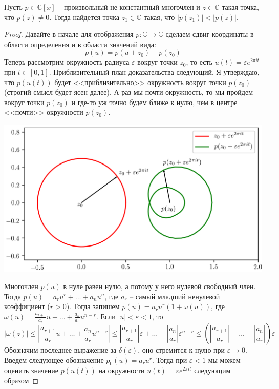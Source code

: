 \begin{claim}
Пусть $p\in\mathbb C[x]$ -- произвольный не константный многочлен и $z\in \mathbb C$ такая точка, что $p(z)\neq 0$. Тогда найдется точка $z_1\in \mathbb C$ такая, что $|p(z_1)|<|p(z)|$.
\end{claim}
\begin{proof}

Давайте в начале для отображения $p\colon \mathbb C\to \mathbb C$ сделаем сдвиг координаты в области определения и в области значений вида:
\[
p(u) = p(u + z_0) - p(z_0)
\]
Теперь рассмотрим окружность радиуса $\varepsilon$ вокруг точки $z_0$, то есть $u(t) = \varepsilon e^{2\pi i t}$ при $t\in [0,1]$. Приблизительный план доказательства следующий. Я утверждаю, что $p(u(t))$ будет <<приблизительно>> окружность вокруг точки $p(z_0)$ (строгий смысл будет ясен далее). А раз мы почти окружность, то мы пройдем вокруг точки $p(z_0)$ и где-то уж точно будем ближе к нулю, чем в центре <<почти>> окружности $p(z_0)$.
\begin{center}
\includegraphics[scale = 0.5]{Figures/graph_cyrcle_cut.png}
\end{center}
Многочлен $p(u)$ в нуле равен нулю, а потому у него нулевой свободный член. Тогда $p(u) = a_r u^r + \ldots + a_n u^n$, где $a_r$ -- самый младший ненулевой коэффициент ($r > 0$). Тогда запишем $p(u) = a_r u^r (1 + \omega(u))$, где $\omega(u) = \frac{a_{r+1}}{a_r}u + \ldots + \frac{a_n}{a_r} u^{n-r}$. Если $|u| < \varepsilon < 1$, то 
\[
|\omega(z)| \leqslant \left| \frac{a_{r+1}}{a_r}u+ \ldots + \frac{a_n}{a_r} u^{n-r}\right| \leqslant  \left|\frac{a_{r+1}}{a_r}\right| \varepsilon+ \ldots + \left|\frac{a_n}{a_r}\right| \varepsilon^{n-r} \leqslant  \left(\left|\frac{a_{r+1}}{a_r}\right|+ \ldots + \left|\frac{a_n}{a_r}\right| \right)\varepsilon
\]
Обозначим последнее выражение за $\delta(\varepsilon)$, оно стремится к нулю при $\varepsilon \to 0$. Введем следующее обозначение $p_0(u) = a_r u^r$. Тогда при $\varepsilon < 1$ мы можем оценить значение $p(u(t))$ на окружности $u(t) = \varepsilon e^{2\pi i t}$ следующим образом

\end{proof}
